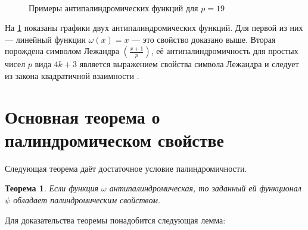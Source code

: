 \documentclass[14pt, a4paper, russian]{report}
\newtheorem{theorem}{\indent Теорема}
\begin{document}
\begin{figure}[!h]
    \\
    \caption{\footnotesize{Примеры антипалиндромических функций для $p=19$}}
\label{fig:antipalindromic}
\end{figure}

На \cref{fig:antipalindromic} показаны графики двух антипалиндромических функций. Для первой из них --- линейный функции $\omega(x)=x$ --- это свойство доказано выше. Вторая порождена символом Лежандра $(\frac{x+1}{p})$, её антипалиндромичность для простых чисел $p$ вида $4k+3$ является выражением свойства символа Лежандра и следует из закона квадратичной взаимности \cite{vinogradov}.

\section{Основная теорема о палиндромическом свойстве}
Следующая теорема даёт достаточное условие палиндромичности.

\begin{theorem}\label{palindromic_theorem}
Если функция $\omega$ антипалиндромическая, то заданный ей функционал $\psi$ обладает палиндромическим свойством.
\end{theorem}

Для доказательства теоремы понадобится следующая лемма:
\end{document}

